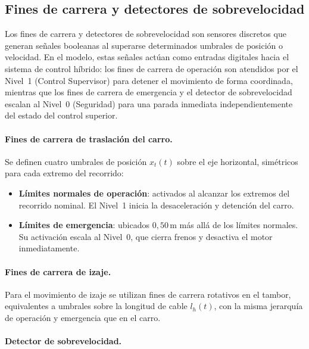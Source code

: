 \documentclass[12pt, a4paper]{article}
\begin{document}
\subsection{Fines de carrera y detectores de sobrevelocidad}
\label{sec:fines-carrera}

Los fines de carrera y detectores de sobrevelocidad son sensores discretos que generan
señales booleanas al superarse determinados umbrales de posición o velocidad. En el
modelo, estas señales actúan como entradas digitales hacia el sistema de control
híbrido: los fines de carrera de operación son atendidos por el Nivel~1 (Control
Supervisor) para detener el movimiento de forma coordinada, mientras que los fines de
carrera de emergencia y el detector de sobrevelocidad escalan al Nivel~0 (Seguridad)
para una parada inmediata independientemente del estado del control superior.

\paragraph{Fines de carrera de traslación del carro.}

Se definen cuatro umbrales de posición $x_t(t)$ sobre el eje horizontal, simétricos
para cada extremo del recorrido:

\begin{itemize}
    \item \textbf{Límites normales de operación}: activados al alcanzar los extremos
    del recorrido nominal. El Nivel~1 inicia la desaceleración y detención del carro.
    \item \textbf{Límites de emergencia}: ubicados $0{,}50$\,m más allá de los límites
    normales. Su activación escala al Nivel~0, que cierra frenos y desactiva el motor
    inmediatamente.
\end{itemize}

\paragraph{Fines de carrera de izaje.}

Para el movimiento de izaje se utilizan fines de carrera rotativos en el tambor,
equivalentes a umbrales sobre la longitud de cable $l_h(t)$, con la misma jerarquía
de operación y emergencia que en el carro.

\paragraph{Detector de sobrevelocidad.}
\end{document}
